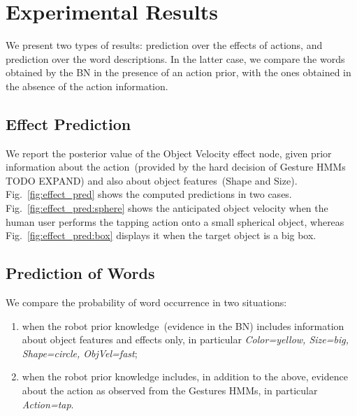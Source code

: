 
\section{Experimental Results}

We present two types of results: prediction over the effects of actions, and prediction over the word descriptions. In the latter case, we compare the words obtained by the \acl{BN} in the presence of an action prior, with the ones obtained in the absence of the action information.

\subsection{Effect Prediction}

We report the posterior value of the Object Velocity effect node, given prior information about the action~(provided by the hard decision of Gesture \acp{HMM} TODO EXPAND) and also about object features~(Shape and Size). Fig.~\ref{fig:effect_pred} shows the computed predictions in two cases. Fig.~\ref{fig:effect_pred:sphere} shows the anticipated object velocity when the human user performs the tapping action onto a small spherical object, whereas Fig.~\ref{fig:effect_pred:box} displays it when the target object is a big box.

\begin{figure*}
     \quad
    \caption{Object velocity predictions, given prior information~(from Gesture \acp{HMM}) that the human user performs a tapping action.}
    \label{fig:effect_pred}
\end{figure*}

\subsection{Prediction of Words}

We compare the probability of word occurrence in two situations:
\begin{enumerate}
\item when the robot prior knowledge~(evidence in the \ac{BN}) includes information about object features and effects only, in particular \emph{Color=yellow, Size=big, Shape=circle, ObjVel=fast};

\item when the robot prior knowledge includes, in addition to the above, evidence about the action as observed from the Gestures \acp{HMM}, in particular \emph{Action=tap}.
\end{enumerate}

